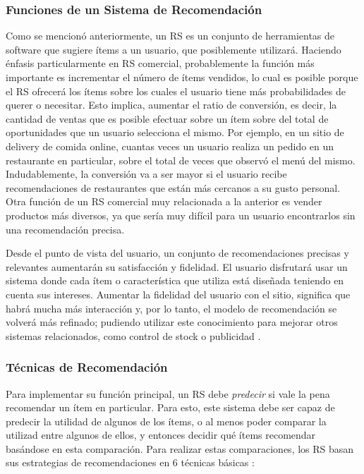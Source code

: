 \subsubsection{Funciones de un Sistema de Recomendación}
Como se mencionó anteriormente, un RS es un conjunto de herramientas de software que sugiere ítems a un usuario, que posiblemente utilizará. Haciendo énfasis particularmente en RS comercial, probablemente la función más importante es incrementar el número de ítems vendidos, lo cual es posible porque el RS ofrecerá los ítems sobre los cuales el usuario tiene más probabilidades de querer o necesitar. Esto implica, aumentar el ratio de conversión, es decir, la cantidad de ventas que es posible efectuar sobre un ítem sobre del total de oportunidades que un usuario selecciona el mismo. Por ejemplo, en un sitio de delivery de comida online, cuantas veces un usuario realiza un pedido en un restaurante en particular, sobre el total de veces que observó el menú del mismo. Indudablemente, la conversión va a ser mayor si el usuario recibe recomendaciones de restaurantes que están más cercanos a su gusto personal. Otra función de un RS comercial muy relacionada a la anterior es vender productos más diversos, ya que sería muy difícil para un usuario encontrarlos sin una recomendación precisa.

\bigskip Desde el punto de vista del usuario, un conjunto de recomendaciones precisas y relevantes aumentarán su satisfacción y fidelidad. El usuario disfrutará usar un sistema donde cada ítem o característica que utiliza está diseñada teniendo en cuenta sus intereses. Aumentar la fidelidad del usuario con el sitio, significa que habrá mucha más interacción y, por lo tanto, el modelo de recomendación se volverá más refinado; pudiendo utilizar este conocimiento para mejorar otros sistemas relacionados, como control de stock o publicidad \citep{ricci2011introduction}.

\subsubsection{Técnicas de Recomendación}
Para implementar su función principal, un RS debe \textit{predecir} si vale la pena recomendar un ítem en particular. Para esto, este sistema debe ser capaz de predecir la utilidad de algunos de los ítems, o al menos poder comparar la utilizad entre algunos de ellos, y entonces decidir qué ítems recomendar basándose en esta comparación. Para realizar estas comparaciones, los RS basan sus estrategias de recomendaciones en 6 técnicas básicas \citep{ricci2011introduction}:

